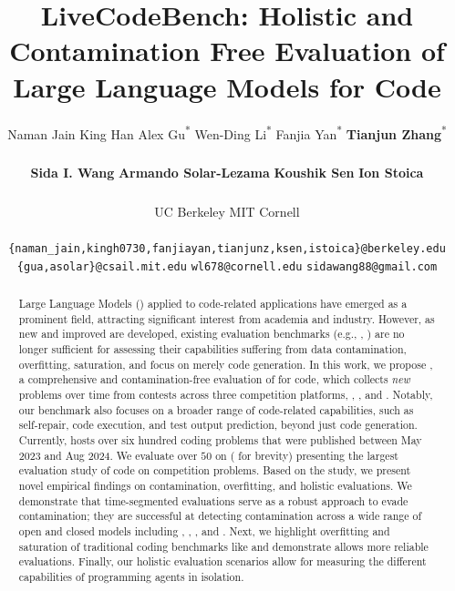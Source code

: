 \documentclass{article} %
\title{LiveCodeBench: Holistic and Contamination Free Evaluation of Large Language Models for Code}
\author{Naman Jain\textsuperscript{\textdagger} \quad 
King Han\textsuperscript{\textdagger} \quad 
Alex Gu\textsuperscript{*} \textsuperscript{\textdollar} \quad 
Wen-Ding Li\textsuperscript{*}\textsuperscript{\textdaggerdbl} \quad  
Fanjia Yan\textsuperscript{*}\textsuperscript{\textdagger} \quad
\textbf{Tianjun Zhang}\textsuperscript{*}\textsuperscript{\textdagger} \\ \\
\quad \quad \quad \quad \quad \textbf{Sida I. Wang}%
\quad 
\textbf{Armando Solar-Lezama}\textsuperscript{\textdollar} \quad \textbf{Koushik Sen}\textsuperscript{\textdagger} \quad 
\textbf{Ion Stoica}\textsuperscript{\textdagger} \\ \\
\quad \quad \quad \quad \quad \quad \quad \quad \quad \quad \quad \textsuperscript{\textdagger} UC Berkeley \quad \quad \textsuperscript{\textdollar} MIT \quad \quad \textsuperscript{\textdaggerdbl} Cornell 
\\
{ }\\
\texttt{\{naman\_jain,kingh0730,fanjiayan,tianjunz,ksen,istoica\}@berkeley.edu}\\
\texttt{\{gua,asolar\}@csail.mit.edu} \quad \texttt{wl678@cornell.edu} \quad \texttt{sidawang88@gmail.com}
\vspace{-4pt}
}
\begin{document}
\maketitle

\begin{abstract}
  \noindent Large Language Models (\llms{}) applied to code-related applications have emerged as a prominent field, attracting significant interest from academia and industry.
  However, as new and improved \llms{} are developed, existing evaluation benchmarks (e.g., \humaneval{}, \mbpp{}) are no longer sufficient for assessing their capabilities suffering from data contamination, overfitting, saturation, and focus on merely code generation.
  In this work, we propose \livecodebench{}, a comprehensive and contamination-free evaluation of \llms{} for code, which collects \textit{new} problems over time from contests across three competition platforms, \leetcode{}, \atcoder{}, and \codeforces{}.
  Notably, our benchmark also focuses on a broader range of code-related capabilities, such as self-repair, code execution, and test output prediction, beyond just code generation.
  Currently, \livecodebench{} hosts over six hundred coding problems that were published between May 2023 and Aug 2024.
  We evaluate over $50$ \llms{} on \livecodebench{} (\lcb{} for brevity) presenting the largest evaluation study of code \llms{} on competition problems. 
  Based on the study, we present novel empirical findings on contamination, overfitting, and holistic evaluations. 
  We demonstrate that time-segmented evaluations serve as a robust approach to evade contamination; they are successful at detecting contamination across a wide range of open and closed models including \gptfouro{}, \claude{}, \deepseek{}, and \codestral{}.
  Next, we highlight overfitting and saturation of traditional coding benchmarks like \humaneval{} and demonstrate \lcb{} allows more reliable evaluations.
  Finally, our holistic evaluation scenarios allow for measuring the different capabilities of programming agents in isolation.
\end{abstract}
\end{document}
